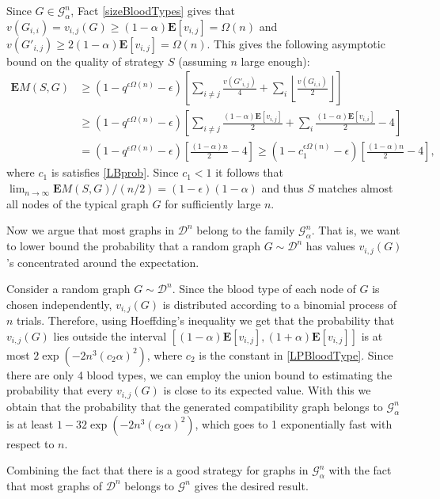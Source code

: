 \documentclass[12pt]{article}
\newcommand{\E}[1]{\mathbf{E}\left[#1\right]}
\newcommand{\EMf}[2]{\mathbf{E}M(#1,#2)}
\begin{document}
		Since $G \in \mathcal{G}^n_\alpha$, Fact \ref{sizeBloodTypes} gives that $v(G_{i,i}) = v_{i,j}(G) \ge (1- \alpha) \E{v_{i,j}} = \Omega(n)$ and $v(G'_{i,j}) \ge 2(1 - \alpha) \E{v_{i,j}} = \Omega(n)$. This gives the following asymptotic bound on the quality of strategy $S$ (assuming $n$ large enough):
\begin{align*}
			\EMf{S}{G} & \ge \left(1 - q^{\epsilon \Omega(n)} - \epsilon \right) \left[ \sum_{i \neq j} \frac{v(G'_{i,j})}{4} + \sum_i \left \lfloor \frac{v(G_{i,i})}{2} \right \rfloor \right] \\
			& \ge \left(1 - q^{\epsilon \Omega(n)} - \epsilon \right) \left[ \sum_{i \neq j} \frac{(1 - \alpha) \E{v_{i,j}}}{2} + \sum_i \frac{(1 - \alpha) \E{v_{i,i}}}{2} - 4 \right] \\
			& = \left(1 - q^{\epsilon \Omega(n)} - \epsilon \right) \left[ \frac{(1 - \alpha) n}{2} - 4 \right] \ge \left(1 - c_1^{\epsilon \Omega(n)} - \epsilon \right) \left[ \frac{(1 - \alpha) n}{2} - 4 \right],
		\end{align*}
		where $c_1$ is satisfies \eqref{LBprob}. Since $c_1 < 1$ it follows that $\lim_{n \rightarrow \infty} \EMf{S}{G} / (n/2) = (1 - \epsilon) (1 - \alpha)$ and thus $S$ matches almost all nodes of the typical graph $G$ for sufficiently large $n$. 
		
		Now we argue that most graphs in $\mathcal{D}^n$ belong to the family $\mathcal{G}^n_{\alpha}$. That is, we want to lower bound the probability that a random graph $G \sim \mathcal{D}^n$ has values $v_{i,j}(G)$'s concentrated around the expectation. 
		
		Consider a random graph $G \sim \mathcal{D}^n$. Since the blood type of each node of $G$ is chosen independently, $v_{i,j}(G)$ is  distributed according to a binomial process of $n$ trials. Therefore, using Hoeffding's inequality \cite{BoucheronLB03} we get that the probability that $v_{i,j}(G)$ lies outside the interval $[(1 - \alpha) \E{v_{i,j}} ,(1 + \alpha) \E{v_{i,j}}]$ is at most $2 \exp(- 2 n^3 (c_2 \alpha)^2)$, where $c_2$ is the constant in \eqref{LPBloodType}. Since there are only 4 blood types, we can employ the union bound to estimating the probability that every $v_{i,j}(G)$ is close to its expected value. With this we obtain that the probability that the generated compatibility graph belongs to $\mathcal{G}^n_{\alpha}$ is at least $1 - 32 \exp(-2 n^3 (c_2 \alpha)^2)$, which goes to 1 exponentially fast with respect to $n$.
		
		Combining the fact that there is a good strategy for graphs in $\mathcal{G}^n_{\alpha}$ with the fact that most graphs of $\mathcal{D}^n$ belongs to $\mathcal{G}^n$ gives the desired result. 
		
\end{document}
